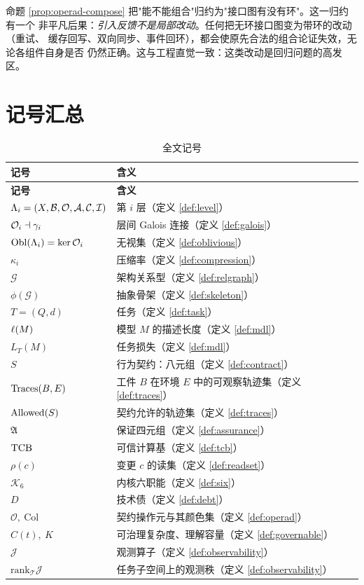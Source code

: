 \begin{remark}\label{rmk:feedback}
命题 \ref{prop:operad-compose} 把"能不能组合"归约为"接口图有没有环"。这一归约有一个
非平凡后果：\emph{引入反馈不是局部改动}。任何把无环接口图变为带环的改动（重试、
缓存回写、双向同步、事件回环），都会使原先合法的组合论证失效，无论各组件自身是否
仍然正确。这与工程直觉一致：这类改动是回归问题的高发区。
\end{remark}

\section{记号汇总}\label{sec:notation}

\begin{longtable}{L{3.2cm}L{11.3cm}}
\caption{全文记号}\label{tab:notation}\\
\toprule
\textbf{记号} & \textbf{含义} \\
\midrule
\endfirsthead
\toprule
\textbf{记号} & \textbf{含义} \\
\midrule
\endhead
\bottomrule
\endlastfoot
$\Lambda_i = (X, \mathcal{B}, \mathcal{O}, \mathcal{A}, \mathcal{C}, \mathcal{I})$ & 第 $i$ 层（定义 \ref{def:level}）\\
$\mathcal{O}_i \dashv \gamma_i$ & 层间 Galois 连接（定义 \ref{def:galois}）\\
$\operatorname{Obl}(\Lambda_i) = \operatorname{ker} \mathcal{O}_i$ & 无视集（定义 \ref{def:oblivious}）\\
$\kappa_i$ & 压缩率（定义 \ref{def:compression}）\\
$\mathcal{G}$ & 架构关系型（定义 \ref{def:relgraph}）\\
$\phi(\mathcal{G})$ & 抽象骨架（定义 \ref{def:skeleton}）\\
$T = (Q,d)$ & 任务（定义 \ref{def:task}）\\
$\ell(M)$ & 模型 $M$ 的描述长度（定义 \ref{def:mdl}）\\
$L_T(M)$ & 任务损失（定义 \ref{def:mdl}）\\
$S$ & 行为契约：八元组（定义 \ref{def:contract}）\\
$\operatorname{Traces}(B,E)$ & 工件 $B$ 在环境 $E$ 中的可观察轨迹集（定义 \ref{def:traces}）\\
$\operatorname{Allowed}(S)$ & 契约允许的轨迹集（定义 \ref{def:traces}）\\
$\mathfrak{A}$ & 保证四元组（定义 \ref{def:assurance}）\\
$\mathrm{TCB}$ & 可信计算基（定义 \ref{def:tcb}）\\
$\rho(c)$ & 变更 $c$ 的读集（定义 \ref{def:readset}）\\
$\mathcal{K}_6$ & 内核六职能（定义 \ref{def:six}）\\
$D$ & 技术债（定义 \ref{def:debt}）\\
$\mathcal{O},\ \mathrm{Col}$ & 契约操作元与其颜色集（定义 \ref{def:operad}）\\
$C(t),\ K$ & 可治理复杂度、理解容量（定义 \ref{def:governable}）\\
$\mathcal{J}$ & 观测算子（定义 \ref{def:observability}）\\
$\mathrm{rank}_{\mathcal{T}}\mathcal{J}$ & 任务子空间上的观测秩（定义
  \ref{def:observability}）\\
\end{longtable}
